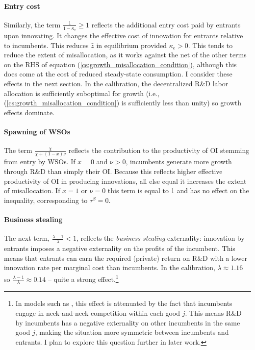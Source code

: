 \documentclass[11pt,english]{article}
\begin{document}
\paragraph{Entry cost}

Similarly, the term $\frac{1}{1-\kappa_e} \ge 1$ reflects the additional entry cost paid by entrants upon innovating. It changes the effective cost of innovation for entrants relative to incumbents. This reduces $\hat{z}$ in equilibrium provided $\kappa_e > 0$. This tends to reduce the extent of misallocation, as it works against the net of the other terms on the RHS of equation (\ref{cs:growth_misallocation_condition}), although this does come at the cost of reduced steady-state consumption. I consider these effects in the next section. In the calibration, the decentralized R\&D labor allocation is sufficiently suboptimal for growth (i.e., (\ref{cs:growth_misallocation_condition}) is sufficiently less than unity) so growth effects dominate. 

\paragraph{Spawning of WSOs}

The term $\frac{\chi}{\chi + (1-x)\nu}$ reflects the contribution to the productivity of OI stemming from entry by WSOs. If $x = 0$ and $\nu > 0$, incumbents generate more growth through R\&D than simply their OI. Because this reflects higher effective productivity of OI in producing innovations, all else equal it increases the extent of misallocation. If $x = 1$ or $\nu = 0$ this term is equal to 1 and has no effect on the inequality, corresponding to $\tau^S = 0$.

\paragraph{Business stealing}

The next term, $\frac{\lambda - 1}{\lambda} < 1$, reflects the \textit{business stealing} externality: innovation by entrants imposes a negative externality on the profits of the incumbent. This means that entrants can earn the required (private) return on R\&D with a lower innovation rate per marginal cost than incumbents. In the calibration, $\lambda \approx 1.16$ so $\frac{\lambda-1}{\lambda} \approx 0.14$ -- quite a strong effect.\footnote{In models such as \cite{aghion_competition_2005}, this effect is attenuated by the fact that incumbents engage in neck-and-neck competition within each good $j$. This means R\&D by incumbents has a negative externality on other incumbents in the same good $j$, making the situation more symmetric between incumbents and entrants. I plan to explore this question further in later work.}
\end{document}
